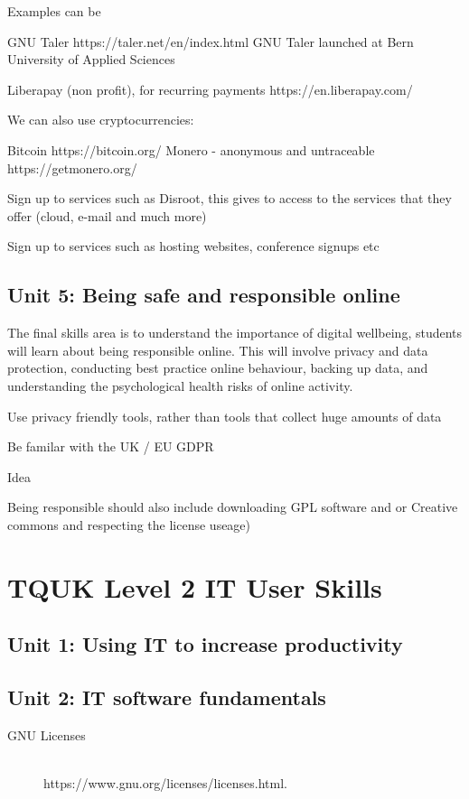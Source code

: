 Examples can be



    GNU Taler https://taler.net/en/index.html
        GNU Taler launched at Bern University of Applied Sciences

    Liberapay (non profit), for recurring payments https://en.liberapay.com/

We can also use cryptocurrencies:

    Bitcoin https://bitcoin.org/
    Monero - anonymous and untraceable https://getmonero.org/



Sign up to services such as Disroot, this gives to access to the services that they offer (cloud, e-mail and much more)

Sign up to services such as hosting websites,  conference signups etc


\section{Unit 5: Being safe and responsible online}

The final skills area is to understand the importance of digital wellbeing, students will learn about being responsible online. This will involve privacy and data protection, conducting best practice online behaviour, backing up data, and understanding the psychological health risks of online activity.

Use privacy friendly tools, rather than tools that collect huge amounts of data

Be familar with the UK / EU GDPR


Idea

Being responsible should also include downloading GPL software and or Creative commons and respecting the license useage)

\chapter{TQUK  Level 2 IT User Skills}

\section{Unit 1: Using IT to increase productivity}
\section{Unit 2: IT software fundamentals}

\begin{description}
  \item[GNU Licenses] \mbox{}\\ https://www.gnu.org/licenses/licenses.html.
\end{description}






